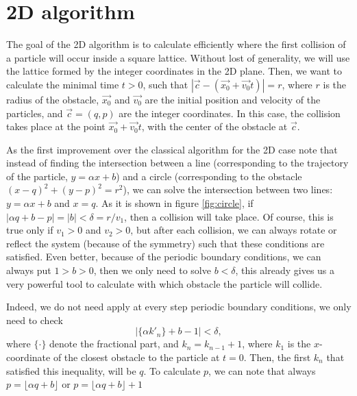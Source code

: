 \documentclass[prl,amsmath,amssymb, twocolumn, showpacs]{revtex4-1}
\begin{document}
\section{2D algorithm}
\label{algorithm}

The goal of the 2D algorithm is to calculate efficiently where the first collision of a particle will occur inside a square lattice. Without lost of generality, we will use the lattice formed by the integer coordinates in the 2D plane. Then, we want to calculate the minimal time $t>0$, such that $|\vec{c}-(\vec{x_0}+\vec{v_0}t)|=r$, where $r$ is the radius of the obstacle, $\vec{x_0}$ and $\vec{v_0}$ are the initial position and velocity of the particles, and $\vec{c}=(q,p)$ are the integer coordinates. In this case, the collision takes place at the point $\vec{x_0}+\vec{v_0}t$, with the center of the obstacle at $\vec{c}$. 

As the first improvement over the classical algorithm for the 2D case note that instead of finding the intersection between a line (corresponding to the trajectory of the particle, $y=\alpha x+b$) and a circle (corresponding to the obstacle $(x-q)^2+(y-p)^2=r^2$), we can solve the intersection between two lines: $y=\alpha x+b$ and $x=q$. As it is shown in figure \ref{fig:circle}, if $|\alpha q+b-p|=|b|<\delta=r/v_1$, then a collision will take place. Of course, this is true only if $v_1>0$ and $v_2>0$, but after each collision, we can always rotate or reflect the system (because of the symmetry) such that these conditions are satisfied. Even better, because of the periodic boundary conditions, we can always put $1>b>0$, then we only need to solve $b<\delta$, this already gives us a very powerful tool to calculate with which obstacle the particle will collide. 

Indeed, we do not need apply at every step periodic boundary conditions, we only need to check 
\begin{equation}
|\{ \alpha  k'_n \}+b -1|< \delta, 
\label{eq:master}
\end{equation}
where $\{ \cdot \}$ denote the fractional part, and $k_n=k_{n-1}+1$, where $k_1$ is the $x$-coordinate of the closest obstacle to the particle at $t=0$. Then, the first $k_n$ that satisfied this inequality, will be $q$. To calculate $p$, we can note that always $p=\lfloor \alpha q +b\rfloor$ or $p=\lfloor \alpha q +b\rfloor+1$
\end{document}
